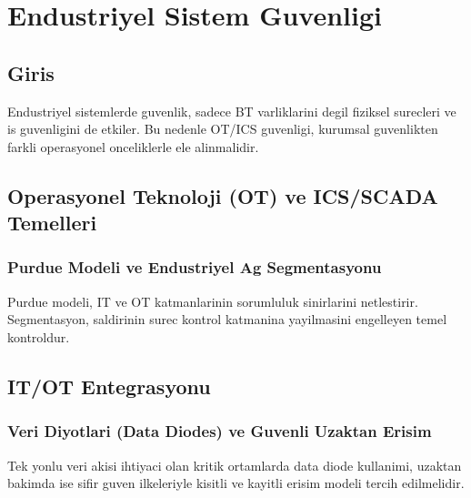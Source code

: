 ﻿\chapter{Endustriyel Sistem Guvenligi}

\section*{Giris}
Endustriyel sistemlerde guvenlik, sadece BT varliklarini degil fiziksel surecleri ve is guvenligini de etkiler. Bu nedenle OT/ICS guvenligi, kurumsal guvenlikten farkli operasyonel onceliklerle ele alinmalidir.

\section{Operasyonel Teknoloji (OT) ve ICS/SCADA Temelleri}
\subsection{Purdue Modeli ve Endustriyel Ag Segmentasyonu}
Purdue modeli, IT ve OT katmanlarinin sorumluluk sinirlarini netlestirir. Segmentasyon, saldirinin surec kontrol katmanina yayilmasini engelleyen temel kontroldur.

\section{IT/OT Entegrasyonu}
\subsection{Veri Diyotlari (Data Diodes) ve Guvenli Uzaktan Erisim}
Tek yonlu veri akisi ihtiyaci olan kritik ortamlarda data diode kullanimi, uzaktan bakimda ise sifir guven ilkeleriyle kisitli ve kayitli erisim modeli tercih edilmelidir.

